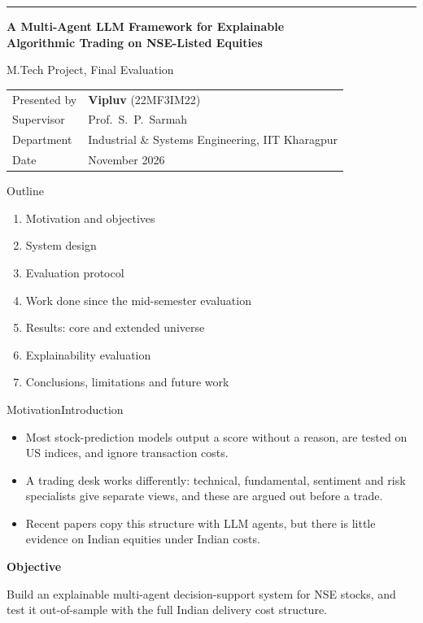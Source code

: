 \documentclass[aspectratio=169,11pt]{beamer}
\newenvironment{pts}{\begin{itemize}\setlength{\itemsep}{0.6em}}{\end{itemize}}
\newcommand{\lead}[1]{{\small\bfseries\color{accent}#1}\par\vspace{0.35em}}
\begin{document}
{
\begin{frame}
\vspace*{1.6cm}
{\color{accent}\rule{2.2cm}{2.2pt}}\par\vspace{0.9em}
{\LARGE\bfseries A Multi-Agent LLM Framework for Explainable\\[0.25em]Algorithmic Trading on NSE-Listed Equities}\par\vspace{0.9em}
{\large\color{muted}M.Tech Project, Final Evaluation}\par\vspace{2.0em}
\begin{tabular}{@{}ll@{}}
\textcolor{muted}{Presented by} & \textbf{Vipluv} (22MF3IM22)\\[0.25em]
\textcolor{muted}{Supervisor} & Prof.\ S.\ P.\ Sarmah\\[0.25em]
\textcolor{muted}{Department} & Industrial \& Systems Engineering, IIT Kharagpur\\[0.25em]
\textcolor{muted}{Date} & November 2026
\end{tabular}
\end{frame}}

\begin{frame}{Outline}

\vspace{0.4em}
\begin{enumerate}\setlength{\itemsep}{0.75em}
\item Motivation and objectives
\item System design
\item Evaluation protocol
\item Work done since the mid-semester evaluation
\item Results: core and extended universe
\item Explainability evaluation
\item Conclusions, limitations and future work
\end{enumerate}
\end{frame}

\begin{frame}{Motivation\hfill{\normalfont\footnotesize\color{muted}Introduction}}

\begin{pts}
\item Most stock-prediction models output a score without a reason, are tested on US indices, and ignore transaction costs.
\item A trading desk works differently: technical, fundamental, sentiment and risk specialists give separate views, and these are argued out before a trade.
\item Recent papers copy this structure with LLM agents, but there is little evidence on Indian equities under Indian costs.
\end{pts}
\vspace{0.9em}
\lead{Objective}
Build an explainable multi-agent decision-support system for NSE stocks, and test it out-of-sample with the full Indian delivery cost structure.
\end{frame}
\end{document}
